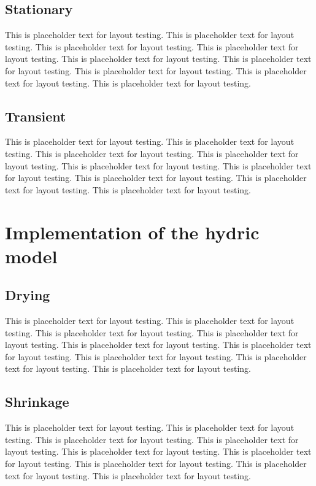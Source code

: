 \documentclass[a4paper,12pt,twoside]{report}     %
\begin{document}
\subsection{Stationary}
This is placeholder text for layout testing. This is placeholder text for layout testing. This is placeholder text for layout testing. This is placeholder text for layout testing. This is placeholder text for layout testing. This is placeholder text for layout testing. This is placeholder text for layout testing. This is placeholder text for layout testing. This is placeholder text for layout testing.
\subsection{Transient}
This is placeholder text for layout testing. This is placeholder text for layout testing. This is placeholder text for layout testing. This is placeholder text for layout testing. This is placeholder text for layout testing. This is placeholder text for layout testing. This is placeholder text for layout testing. This is placeholder text for layout testing. This is placeholder text for layout testing.

\section{Implementation of the hydric model}
\subsection{Drying}
This is placeholder text for layout testing. This is placeholder text for layout testing. This is placeholder text for layout testing. This is placeholder text for layout testing. This is placeholder text for layout testing. This is placeholder text for layout testing. This is placeholder text for layout testing. This is placeholder text for layout testing. This is placeholder text for layout testing.
\subsection{Shrinkage}
This is placeholder text for layout testing. This is placeholder text for layout testing. This is placeholder text for layout testing. This is placeholder text for layout testing. This is placeholder text for layout testing. This is placeholder text for layout testing. This is placeholder text for layout testing. This is placeholder text for layout testing. This is placeholder text for layout testing.
\end{document}
